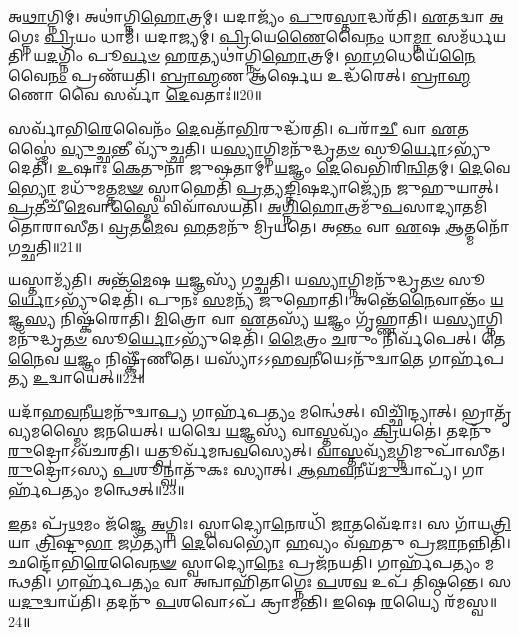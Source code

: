 𑌅\-\ul{𑌥𑌾}\-𑌗𑍍𑌨𑌿𑌮𑍍।
𑌅𑌥𑌾॑𑌗𑍍𑌨𑌿\-\ul{𑌹𑍋}\-𑌤𑍍𑌰𑌮𑍍।
𑌯𑌦𑌾𑌜𑍍𑌯𑌂᳴ \ul{𑌪𑍁}\-𑌰\-\ul{𑌸𑍍𑌤𑌾}\-𑌦𑍍𑌧𑌰᳴𑌤𑌿।
\-\ul{𑌏}\-𑌤𑌦𑍍𑌵𑌾 \ul{𑌅}\-𑌗𑍍𑌨𑍇𑌃 \ul{𑌪𑍍𑌰𑌿}\-𑌯𑌂 𑌧𑌾𑌮᳴।
𑌯𑌦𑌾𑌜𑍍𑌯𑌮𑍍॑।
\-\ul{𑌪𑍍𑌰𑌿}\-𑌯𑍇\-\ul{𑌣𑍈}\-𑌵𑍈\-\ul{𑌨𑌂} 𑌧𑌾\-\ul{𑌮𑍍𑌨𑌾} 𑌸𑌮᳴𑌰𑍍𑌧𑌯𑌤𑌿।
𑌯\-\ul{𑌦}\-𑌗𑍍𑌨𑌿𑌂 𑌪𑍂\-\ul{𑌰𑍍𑌵}\-\-\ul{𑍞} 𑌹\-\ul{𑌰}\-𑌤𑍍𑌯𑌥𑌾॑𑌗𑍍𑌨𑌿\-\ul{𑌹𑍋}\-𑌤𑍍𑌰𑌮𑍍।
\-\ul{𑌭𑌾}\-\-\ul{𑌗}\-𑌧𑍇𑌯𑍇᳴\-\ul{𑌨𑍈}\-𑌵𑍈\-\ul{𑌨𑌂} 𑌪𑍍𑌰𑌣᳴𑌯𑌤𑌿।
\-\ul{𑌬𑍍𑌰𑌾}\-\-\ul{𑌹𑍍𑌮}\-𑌣 𑌆᳴𑌰𑍍\mbox{}\-\ul{𑌷𑍇}\-𑌯 𑌉𑌦𑍍𑌧᳴𑌰𑍇𑌤𑍍।
\-\ul{𑌬𑍍𑌰𑌾}\-\-\ul{𑌹𑍍𑌮}\-𑌣𑍋 𑌵𑍈 𑌸𑌰𑍍𑌵𑌾᳴ \ul{𑌦𑍇}\-𑌵𑌤𑌾𑌃॑॥20॥

𑌸𑌰𑍍𑌵𑌾᳴𑌭𑌿\-\ul{𑌰𑍇}\-𑌵𑍈𑌨𑌂᳴ \ul{𑌦𑍇}\-𑌵𑌤𑌾᳴\-\ul{𑌭𑌿}\-𑌰𑍁𑌦𑍍𑌧᳴𑌰𑌤𑌿।
𑌪𑌰𑌾᳴\-\ul{𑌚𑍀} 𑌵𑌾 \ul{𑌏}\-𑌤𑌸𑍍𑌮𑍈॑ \ul{𑌵𑍍𑌯𑍁}\-𑌚𑍍𑌛\-\ul{𑌨𑍍𑌤𑍀} 𑌵𑍍𑌯𑍁᳴𑌚𑍍𑌛𑌤𑌿।
𑌯\-\ul{𑌸𑍍𑌯𑌾}\-𑌗𑍍𑌨𑌿𑌮𑌨𑍁᳴𑌦𑍍𑌧𑍃\-\ul{𑌤}\-\-\ul{𑍞} 𑌸𑍂\-\ul{𑌰𑍍𑌯𑍋}\-\-𑌽𑌭𑍍𑌯𑍁᳴𑌦𑍇𑌤𑌿᳴।
\-\ul{𑌉}\-𑌷𑌾𑌃 \ul{𑌕𑍇}\-𑌤𑍁𑌨𑌾᳴ 𑌜𑍁𑌷𑌤𑌾𑌮𑍍।
\-\ul{𑌯}\-𑌜𑍍𑌞𑌂 \ul{𑌦𑍇}\-𑌵𑍇𑌭𑌿᳴𑌰𑌿\-\ul{𑌨𑍍𑌵𑌿}\-𑌤𑌮𑍍।
\-\ul{𑌦𑍇}\-𑌵𑍇\-\ul{𑌭𑍍𑌯𑍋} 𑌮𑌧𑍁᳴𑌮𑌤𑍍𑌤\-\ul{𑌮}\-\-\ul{𑍟} 𑌸𑍍𑌵𑌾𑌹𑍇𑌤𑌿᳴ \ul{𑌪𑍍𑌰}\-𑌤𑍍𑌯\-\ul{𑌙𑍍𑌨𑌿}\-𑌷𑌦𑍍𑌯𑌾𑌜𑍍𑌯𑍇᳴𑌨 𑌜𑍁𑌹𑍁𑌯𑌾𑌤𑍍।
\-\ul{𑌪𑍍𑌰}\-𑌤𑍀𑌚𑍀᳴\-\ul{𑌮𑍇}\-𑌵𑌾\-\ul{𑌸𑍍𑌮𑍈} 𑌵𑌿𑌵𑌾᳴𑌸𑌯𑌤𑌿।
\-\ul{𑌅}\-\-\ul{𑌗𑍍𑌨𑌿}\-\-\ul{𑌹𑍋}\-𑌤𑍍𑌰𑌮𑍁᳴\-\ul{𑌪}\-𑌸𑌾𑌦𑍍𑌯𑌾𑌤𑌮𑌿᳴𑌤𑍋𑌰𑌾𑌸𑍀𑌤।
\-\ul{𑌵𑍍𑌰}\-𑌤\-\ul{𑌮𑍇}\-𑌵 \ul{𑌹}\-𑌤𑌮𑌨𑍁᳴ 𑌮𑍍𑌰𑌿𑌯𑌤𑍇।
𑌅\-\ul{𑌨𑍍𑌤𑌂} 𑌵𑌾 \ul{𑌏}\-𑌷 \ul{𑌆}\-𑌤𑍍𑌮𑌨𑍋᳴ 𑌗𑌚𑍍𑌛𑌤𑌿॥21॥

𑌯𑌸𑍍𑌤𑌾𑌮𑍍𑌯᳴𑌤𑌿।
𑌅𑌨𑍍𑌤᳴\-\ul{𑌮𑍇}\-𑌷 \ul{𑌯}\-𑌜𑍍𑌞𑌸𑍍𑌯᳴ 𑌗𑌚𑍍𑌛𑌤𑌿।
𑌯\-\ul{𑌸𑍍𑌯𑌾}\-𑌗𑍍𑌨𑌿𑌮𑌨𑍁᳴𑌦𑍍𑌧𑍃\-\ul{𑌤}\-\-\ul{𑍞} 𑌸𑍂\-\ul{𑌰𑍍𑌯𑍋}\-\-𑌽𑌭𑍍𑌯𑍁᳴𑌦𑍇𑌤𑌿᳴।
𑌪𑍁𑌨𑌃᳴ \ul{𑌸}\-𑌮𑌨𑍍𑌯᳴ 𑌜𑍁𑌹𑍋𑌤𑌿।
𑌅𑌨𑍍𑌤𑍇᳴\-\ul{𑌨𑍈}\-𑌵𑌾𑌨𑍍𑌤𑌂᳴ \ul{𑌯}\-𑌜𑍍𑌞\-\ul{𑌸𑍍𑌯} 𑌨𑌿𑌷𑍍𑌕᳴𑌰𑍋𑌤𑌿।
\-\ul{𑌮𑌿}\-𑌤𑍍𑌰𑍋 𑌵𑌾 \ul{𑌏}\-𑌤𑌸𑍍𑌯᳴ \ul{𑌯}\-𑌜𑍍𑌞𑌂 𑌗𑍃᳴𑌹𑍍𑌣𑌾𑌤𑌿।
𑌯\-\ul{𑌸𑍍𑌯𑌾}\-𑌗𑍍𑌨𑌿𑌮𑌨𑍁᳴𑌦𑍍𑌧𑍃\-\ul{𑌤}\-\-\ul{𑍞} 𑌸𑍂\-\ul{𑌰𑍍𑌯𑍋}\-\-𑌽𑌭𑍍𑌯𑍁᳴𑌦𑍇𑌤𑌿᳴।
\-\ul{𑌮𑍈}\-𑌤𑍍𑌰𑌂 \ul{𑌚}\-𑌰𑍁𑌂 𑌨𑌿𑌰𑍍𑌵᳴𑌪𑍇𑌤𑍍।
𑌤𑍇\-\ul{𑌨𑍈}\-𑌵 \ul{𑌯}\-𑌜𑍍𑌞𑌂 𑌨𑌿𑌷𑍍𑌕𑍍𑌰𑍀᳴𑌣𑍀𑌤𑍇।
𑌯𑌸𑍍𑌯𑌾᳴\-𑌽𑌽𑌹\-\ul{𑌵}\-𑌨𑍀𑌯𑍇\-𑌽𑌨𑍁᳴𑌦𑍍𑌵𑌾\-\ul{𑌤𑍇} 𑌗𑌾𑌰𑍍\mbox{}𑌹᳴𑌪𑌤𑍍𑌯 \ul{𑌉}\-𑌦𑍍𑌵𑌾𑌯𑍇॑𑌤𑍍॥22॥

𑌯𑌦𑌾᳴𑌹\-\ul{𑌵}\-𑌨𑍀\-\ul{𑌯}\-𑌮𑌨𑍁᳴𑌦𑍍𑌵𑌾\-\ul{𑌪𑍍𑌯} 𑌗𑌾𑌰𑍍\mbox{}𑌹᳴𑌪\-\ul{𑌤𑍍𑌯𑌂} 𑌮𑌨𑍍𑌥𑍇॑𑌤𑍍।
𑌵𑌿𑌚𑍍𑌛𑌿᳴𑌨𑍍𑌦𑍍𑌯𑌾𑌤𑍍।
𑌭𑍍𑌰𑌾𑌤𑍃᳴𑌵𑍍𑌯𑌮𑌸𑍍𑌮𑍈 𑌜𑌨𑌯𑍇𑌤𑍍।
𑌯𑌦𑍍𑌵𑍈 \ul{𑌯}\-𑌜𑍍𑌞𑌸𑍍𑌯᳴ 𑌵𑌾\-\ul{𑌸𑍍𑌤}\-𑌵𑍍𑌯𑌂᳴ \ul{𑌕𑍍𑌰𑌿}\-𑌯𑌤𑍇॑।
𑌤𑌦𑌨𑍁᳴ \ul{𑌰𑍁}\-𑌦𑍍𑌰𑍋\-𑌽𑌵᳴𑌚𑌰𑌤𑌿।
𑌯𑌤𑍍𑌪𑍂𑌰𑍍𑌵᳴𑌮𑌨𑍍𑌵\-\ul{𑌵}\-𑌸𑍍𑌯𑍇𑌤𑍍।
\-\ul{𑌵𑌾}\-\-\ul{𑌸𑍍𑌤}\-𑌵𑍍𑌯᳴\-\ul{𑌮}\-𑌗𑍍𑌨𑌿𑌮𑍁𑌪𑌾᳴𑌸𑍀𑌤।
\-\ul{𑌰𑍁}\-𑌦𑍍𑌰𑍋॑𑌽𑌸𑍍𑌯 \ul{𑌪}\-𑌶𑍂𑌨𑍍𑌘𑌾𑌤𑍁᳴𑌕𑌃 𑌸𑍍𑌯𑌾𑌤𑍍।
\-\ul{𑌆}\-\-\ul{𑌹}\-\-\ul{𑌵}\-𑌨𑍀𑌯᳴\-\ul{𑌮𑍁}\-𑌦𑍍𑌵𑌾𑌪𑍍𑌯᳴।
𑌗𑌾𑌰𑍍\mbox{}𑌹᳴𑌪𑌤𑍍𑌯𑌂 𑌮𑌨𑍍𑌥𑍇𑌤𑍍॥23॥

\-\ul{𑌇}\-𑌤𑌃 𑌪𑍍𑌰᳴\-\ul{𑌥}\-𑌮𑌂 𑌜᳴𑌜𑍍𑌞𑍇 \ul{𑌅}\-𑌗𑍍𑌨𑌿𑌃।
𑌸𑍍𑌵𑌾𑌦𑍍𑌯𑍋\-\ul{𑌨𑍇}\-𑌰𑌧𑌿᳴ \ul{𑌜𑌾}\-𑌤𑌵𑍇᳴𑌦𑌾𑌃।
𑌸 𑌗𑌾᳴𑌯\-\ul{𑌤𑍍𑌰𑌿}\-𑌯𑌾 \ul{𑌤𑍍𑌰𑌿}\-𑌷𑍍𑌟𑍁\-\ul{𑌭𑌾} 𑌜𑌗᳴𑌤𑍍𑌯𑌾।
\-\ul{𑌦𑍇}\-𑌵𑍇𑌭𑍍𑌯𑍋᳴ \ul{𑌹}\-𑌵𑍍𑌯𑌂 𑌵᳴𑌹𑌤𑍁 𑌪𑍍𑌰\-\ul{𑌜𑌾}\-𑌨𑌨𑍍𑌨𑌿𑌤𑌿᳴।
𑌛𑌨𑍍𑌦𑍋᳴𑌭𑌿\-\ul{𑌰𑍇}\-𑌵𑍈\-\ul{𑌨}\-\-\ul{𑍟} 𑌸𑍍𑌵𑌾𑌦𑍍𑌯𑍋\-\ul{𑌨𑍇𑌃} 𑌪𑍍𑌰𑌜᳴𑌨𑌯𑌤𑌿।
𑌗𑌾𑌰𑍍\mbox{}𑌹᳴𑌪𑌤𑍍𑌯𑌂 𑌮𑌨𑍍𑌥𑌤𑌿।
𑌗𑌾𑌰𑍍\mbox{}𑌹᳴𑌪\-\ul{𑌤𑍍𑌯𑌂} 𑌵𑌾 𑌅𑌨𑍍𑌵𑌾𑌹𑌿᳴𑌤𑌾𑌗𑍍𑌨𑍇𑌃 \ul{𑌪}\-𑌶\-\ul{𑌵} 𑌉𑌪᳴ 𑌤𑌿𑌷𑍍𑌠𑌨𑍍𑌤𑍇।
𑌸 𑌯\-\ul{𑌦𑍁}\-𑌦𑍍𑌵𑌾𑌯᳴𑌤𑌿।
𑌤𑌦𑌨𑍁᳴ \ul{𑌪}\-𑌶𑌵𑍋𑌽𑌪᳴ 𑌕𑍍𑌰𑌾𑌮𑌨𑍍𑌤𑌿।
\-\ul{𑌇}\-𑌷𑍇 \ul{𑌰}\-𑌯𑍍𑌯𑍈 𑌰᳴𑌮𑌸𑍍𑌵॥24॥

